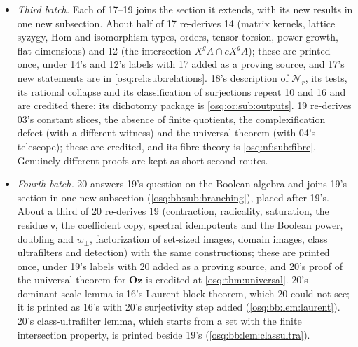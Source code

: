\documentclass[11pt,letterpaper]{article}
\numberwithin{equation}{section}
\theoremstyle{definition}
\theoremstyle{remark}
\theoremstyle{plain}
\newcommand{\Oz}{\mathbf{Oz}}
\newcommand{\Num}{\mathscr N}
\begin{document}
\begin{itemize}
\cref{osq:sec:ordinal}. 12 and 14 form one new section (\cref{osq:hd:sec:cores}), placed after the homological
package it is to be compared with; the ring $A_0=A_1$ and the two-generator syzygy are printed once, the syzygy
in 14's rank generality over 12's rings. 16's results sit with 10's polynomial maps; where they overlap (rational
collapse, affine surjections, transfer, grids) the general-$D$ statement is printed once with 16's fresh-scale
proof and 10's statements keep their finite-difference and lattice proofs as a second route. 14's criterion for
unimodular projective directions and 13's fiber and norm theorems are printed in the Diophantine report
\cite{RepoOdg}, not here.
\item \emph{Third batch.} Each of 17--19 joins the section it extends, with its new results in one new
subsection. About half of 17 re-derives 14 (matrix kernels, lattice syzygy, Hom and isomorphism types, orders,
tensor torsion, power growth, flat dimensions) and 12 (the intersection $X^gA\cap cX^gA$); these are printed
once, under 14's and 12's labels with 17 added as a proving source, and 17's new statements are in
\cref{osq:rel:sub:relations}. 18's description of $\Num_r$, its tests, its rational collapse and its classification of
surjections repeat 10 and 16 and are credited there; its dichotomy package is \cref{osq:or:sub:outputs}. 19
re-derives 03's constant slices, the absence of finite quotients, the complexification defect (with a different
witness) and the universal theorem (with 04's telescope); these are credited, and its fibre theory is
\cref{osq:nf:sub:fibre}. Genuinely different proofs are kept as short second routes.
\item \emph{Fourth batch.} 20 answers 19's question on the Boolean algebra and joins 19's section in one new subsection
(\cref{osq:bb:sub:branching}), placed after 19's. About a third of 20 re-derives 19 (contraction, radicality, saturation, the
residue $\mathsf v$, the coefficient copy, spectral idempotents and the Boolean power, doubling and $w_\pm$, factorization of
set-sized images, domain images, class ultrafilters and detection) with the same constructions; these are printed once, under
19's labels with 20 added as a proving source, and 20's proof of the universal theorem for $\Oz$ is credited at
\cref{osq:thm:universal}. 20's dominant-scale lemma is 16's Laurent-block theorem, which 20 could not see; it is printed as
16's with 20's surjectivity step added (\cref{osq:bb:lem:laurent}). 20's class-ultrafilter lemma, which starts from a set with
the finite intersection property, is printed beside 19's (\cref{osq:bb:lem:classultra}).

\end{itemize}
\end{document}
